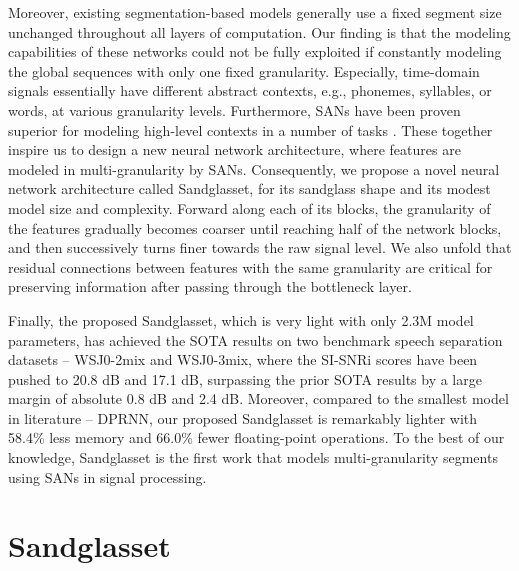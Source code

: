 \documentclass{article}
\begin{document}
\par
Moreover, existing segmentation-based models generally use a fixed segment size unchanged throughout all layers of computation. Our finding is that the modeling capabilities of these networks could not be fully exploited if constantly modeling the global sequences with only one fixed granularity. Especially, time-domain signals essentially have different abstract contexts, e.g., phonemes, syllables, or words, at various granularity levels. Furthermore, SANs have been proven superior for modeling high-level contexts in a number of tasks \cite{shen2017disan, devlin2018bert, dai2019transformer,zhang2019self}. These together inspire us to design a new neural network architecture, where features are modeled in multi-granularity by SANs. 
Consequently, we propose a novel neural network architecture called Sandglasset, for its sandglass shape and its modest model size and complexity. Forward along each of its blocks, the granularity of the features gradually becomes coarser until reaching half of the network blocks, and then successively turns finer towards the raw signal level. We also unfold that residual connections between features with the same granularity are critical for preserving information after passing through the bottleneck layer.
\par
Finally, the proposed Sandglasset, which is very light with only 2.3M model parameters, has achieved the SOTA results on two benchmark speech separation datasets -- WSJ0-2mix and WSJ0-3mix, where the SI-SNRi scores have been pushed to 20.8 dB and 17.1 dB, surpassing the prior SOTA results by a large margin of absolute 0.8 dB and 2.4 dB. Moreover, compared to the smallest model in literature -- DPRNN, our proposed Sandglasset is remarkably lighter with 58.4\% less memory and 66.0\% fewer floating-point operations. To the best of our knowledge, Sandglasset is the first work that models multi-granularity segments using SANs in signal processing.

\section{Sandglasset}
\label{sec:2}
\end{document}
